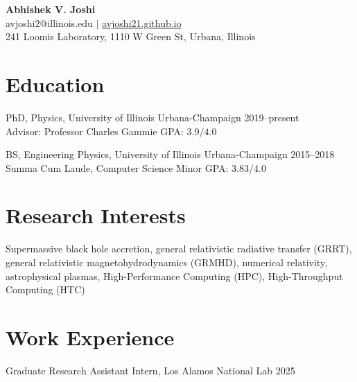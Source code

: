 \documentclass[11pt]{article}
\begin{document}
\begin{center}
{\Large \bfseries Abhishek V. Joshi}\\\vspace{0.5em}
avjoshi2@illinois.edu $|$ \href{https://avjoshi21.github.io}{avjoshi21.github.io} \\\vspace{0.25em} 241 Loomis Laboratory, 1110 W Green St, Urbana, Illinois
\end{center}

\section*{Education}
PhD, Physics, University of Illinois Urbana-Champaign \hfill 2019--present\\
Advisor: Professor Charles Gammie  \hfill {\normalsize GPA: $3.9/4.0$}


BS, Engineering Physics, University of Illinois Urbana-Champaign \hfill 2015--2018\\
{\normalsize Summa Cum Laude, Computer Science Minor} {\hfill GPA: $3.83/4.0$}


\section*{Research Interests}
Supermassive black hole accretion, general relativistic radiative transfer (GRRT), general relativistic magnetohydrodynamics (GRMHD), numerical relativity, astrophysical plasmas, High-Performance Computing (HPC), High-Throughput Computing (HTC)   

\section*{Work Experience}
Graduate Research Assistant Intern, Los Alamos National Lab \hfill 2025
\end{document}
